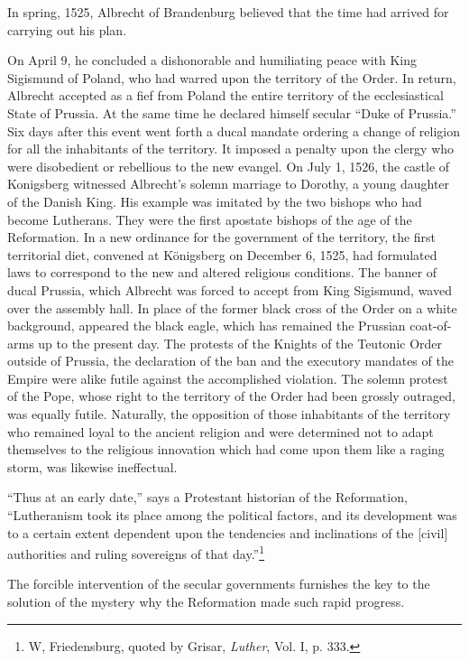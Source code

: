 In spring, 1525, Albrecht of Brandenburg believed that the time
had arrived for carrying out his plan.

On April 9, he concluded a dishonorable and humiliating peace
with King Sigismund of Poland, who had warred upon the territory
of the Order. In return, Albrecht accepted as a fief from Poland the
entire territory of the ecclesiastical State of Prussia. At the same
time he declared himself secular “Duke of Prussia.” Six days after
this event went forth a ducal mandate ordering a change of religion
for all the inhabitants of the territory. It imposed a penalty upon
the clergy who were disobedient or rebellious to the new evangel.
On July 1, 1526, the castle of Konigsberg witnessed Albrecht’s solemn
marriage to Dorothy, a young daughter of the Danish King.
His example was imitated by the two bishops who had become Lutherans.
They were the first apostate bishops of the age of the Reformation.
In a new ordinance for the government of the territory, the
first territorial diet, convened at Königsberg on December 6, 1525,
had formulated laws to correspond to the new and altered religious
conditions. The banner of ducal Prussia, which Albrecht was forced
to accept from King Sigismund, waved over the assembly hall. In
place of the former black cross of the Order on a white background,
appeared the black eagle, which has remained the Prussian coat-of-arms
up to the present day. The protests of the Knights of the Teutonic
Order outside of Prussia, the declaration of the ban and the
executory mandates of the Empire were alike futile against the accomplished
violation. The solemn protest of the Pope, whose right
to the territory of the Order had been grossly outraged, was equally
futile. Naturally, the opposition of those inhabitants of the territory
who remained loyal to the ancient religion and were determined not
to adapt themselves to the religious innovation which had come upon
them like a raging storm, was likewise ineffectual.

“Thus at an early date,” says a Protestant historian of the Reformation,
“Lutheranism took its place among the political factors, and
its development was to a certain extent dependent upon the tendencies
and inclinations of the [civil] authorities and ruling sovereigns
of that day.”\footnote{W, Friedensburg, quoted by Grisar, \textit{Luther}, Vol. I, p. 333.}

The forcible intervention of the secular governments furnishes the
key to the solution of the mystery why the Reformation made such
rapid progress.

